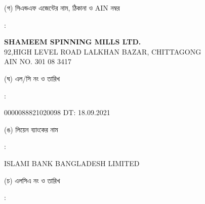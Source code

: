 \documentclass[12pt]{article}
\newcommand{\lcno}{0000088821020098}
\newcommand{\lcdt}{18.09.2021}
\newcommand{\lienbank}{ISLAMI BANK BANGLADESH LIMITED}
\newcommand{\cnfn}{SHAMEEM SPINNING MILLS LTD.}
\newcommand{\cnfadd}{92,HIGH LEVEL ROAD
\newline
LALKHAN BAZAR, CHITTAGONG}
\newcommand{\cnfain}{301 08 3417}
\begin{document}
\begin{minipage}[t]{0.05\linewidth}
\hspace*{1em}
\end{minipage}
\begin{minipage}[t]{0.45\linewidth}
(গ) সিএন্ডএফ এজেন্টের নাম, ঠিকানা
ও AIN নম্বর
\end{minipage}
\begin{minipage}[t]{0.02\linewidth}
:
\end{minipage}
\begin{minipage}[t]{0.50\linewidth}
\textbf{{\cnfn}}
\\
{\cnfadd}
\\
AIN NO. {\cnfain}
\\
\end{minipage}
\begin{minipage}[t]{0.05\linewidth}
\hspace*{1em}
\end{minipage}
\begin{minipage}[t]{0.45\linewidth}
(ঘ) এল/সি নং ও তারিখ
\end{minipage}
\begin{minipage}[t]{0.02\linewidth}
:
\end{minipage}
\begin{minipage}[t]{0.50\linewidth}
{\lcno} \hspace{2em} DT: {\lcdt}
\\
\end{minipage}
\begin{minipage}[t]{0.05\linewidth}
\hspace*{1em}
\end{minipage}
\begin{minipage}[t]{0.45\linewidth}
(ঙ) লিয়েন ব্যাংকের নাম
\end{minipage}
\begin{minipage}[t]{0.02\linewidth}
:
\end{minipage}
\begin{minipage}[t]{0.50\linewidth}
{\lienbank}
\\
\end{minipage}
\begin{minipage}[t]{0.05\linewidth}
\hspace*{1em}
\end{minipage}
\begin{minipage}[t]{0.45\linewidth}
(চ) এলসিএ নং ও তারিখ
\end{minipage}
\begin{minipage}[t]{0.02\linewidth}
:
\end{minipage}
\end{document}
